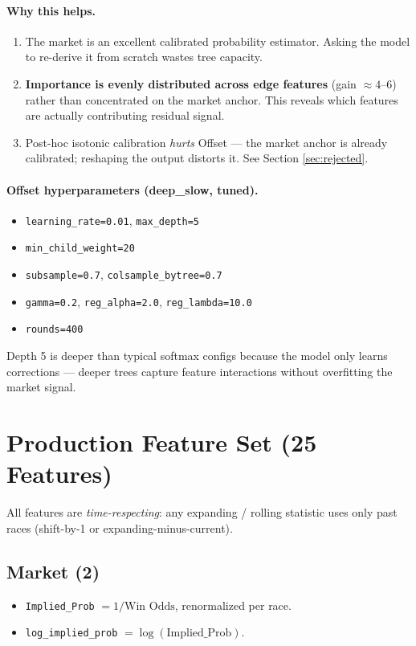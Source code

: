 \documentclass[11pt]{article}
\begin{document}
\paragraph{Why this helps.}
\begin{enumerate}\item The market is an excellent calibrated probability estimator. Asking
      the model to re-derive it from scratch wastes tree capacity.
\item \textbf{Importance is evenly distributed across edge features}
      (gain $\approx 4$--$6$) rather than concentrated on the market
      anchor. This reveals which features are actually contributing
      residual signal.
\item Post-hoc isotonic calibration \emph{hurts} Offset --- the market
      anchor is already calibrated; reshaping the output distorts it.
      See Section \ref{sec:rejected}.
\end{enumerate}

\paragraph{Offset hyperparameters (deep\_slow, tuned).}
\begin{itemize}\item \texttt{learning\_rate=0.01}, \texttt{max\_depth=5}
\item \texttt{min\_child\_weight=20}
\item \texttt{subsample=0.7}, \texttt{colsample\_bytree=0.7}
\item \texttt{gamma=0.2}, \texttt{reg\_alpha=2.0}, \texttt{reg\_lambda=10.0}
\item \texttt{rounds=400}
\end{itemize}

Depth 5 is deeper than typical softmax configs because the model only
learns corrections --- deeper trees capture feature interactions without
overfitting the market signal.

\section{Production Feature Set (25 Features)}

All features are \emph{time-respecting}: any expanding / rolling
statistic uses only past races (shift-by-1 or expanding-minus-current).

\subsection{Market (2)}
\begin{itemize}\item \texttt{Implied\_Prob} $= 1/\text{Win Odds}$, renormalized per race.
\item \texttt{log\_implied\_prob} $= \log(\text{Implied\_Prob})$.
\end{itemize}
\end{document}
